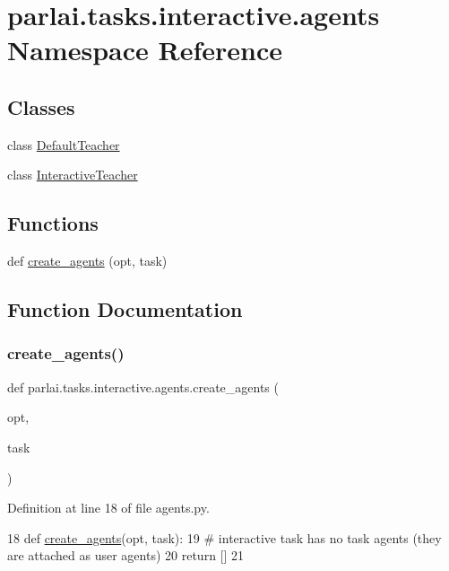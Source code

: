 \hypertarget{namespaceparlai_1_1tasks_1_1interactive_1_1agents}{}\section{parlai.\+tasks.\+interactive.\+agents Namespace Reference}
\label{namespaceparlai_1_1tasks_1_1interactive_1_1agents}
\subsection*{Classes}
\begin{DoxyCompactItemize}
\item 
class \hyperlink{classparlai_1_1tasks_1_1interactive_1_1agents_1_1DefaultTeacher}{Default\+Teacher}
\item 
class \hyperlink{classparlai_1_1tasks_1_1interactive_1_1agents_1_1InteractiveTeacher}{Interactive\+Teacher}
\end{DoxyCompactItemize}
\subsection*{Functions}
\begin{DoxyCompactItemize}
\item 
def \hyperlink{namespaceparlai_1_1tasks_1_1interactive_1_1agents_af1eee4433fa720c868ac8cea506bfc89}{create\+\_\+agents} (opt, task)
\end{DoxyCompactItemize}


\subsection{Function Documentation}
\mbox{\label{namespaceparlai_1_1tasks_1_1interactive_1_1agents_af1eee4433fa720c868ac8cea506bfc89}} 
\subsubsection{\texorpdfstring{create\+\_\+agents()}{create\_agents()}}
{\footnotesize\ttfamily def parlai.\+tasks.\+interactive.\+agents.\+create\+\_\+agents (\begin{DoxyParamCaption}\item[{}]{opt,  }\item[{}]{task }\end{DoxyParamCaption})}



Definition at line 18 of file agents.\+py.


\begin{DoxyCode}
18 \textcolor{keyword}{def }\hyperlink{namespaceparlai_1_1tasks_1_1wizard__of__wikipedia_1_1agents_a89bd55d60a50f2604b1eb59ab0e064bc}{create\_agents}(opt, task):
19     \textcolor{comment}{# interactive task has no task agents (they are attached as user agents)}
20     \textcolor{keywordflow}{return} []
21 \end{DoxyCode}
